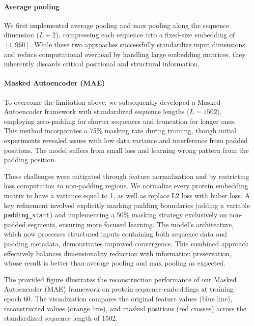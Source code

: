 \documentclass{article}
\begin{document}
	\paragraph{Average pooling} We first implemented {average pooling} and {max pooling} along the sequence dimension ($L+2$), compressing each sequence into a fixed-size embedding of $[1, 960]$. While these two approaches successfully standardize input dimensions and reduce computational overhead by handling large embedding matrices, they inherently discards critical positional and structural information.
	
	\paragraph{Masked Autoencoder (MAE)} To overcome the limitation above, we subsequently developed a {Masked Autoencoder} framework with standardized sequence lengths ($L = 1502$), employing zero-padding for shorter sequences and truncation for longer ones. 
	This method incorporates a 75\% masking rate during training, though initial experiments revealed issues with low data variance and interference from padded positions. The model suffers from small loss and learning wrong pattern from the padding position.
	
	 These challenges were mitigated through feature normalization and by restricting loss computation to non-padding regions. We normalize every protein embedding matrix to have a variance equal to 1, as well as replace L2 loss with huber loss. A key refinement involved explicitly marking padding boundaries (adding a variable \texttt{padding\_start}) and implementing a 50\% masking strategy exclusively on non-padded segments, ensuring more focused learning. The model's architecture, which now processes structured inputs containing both sequence data and padding metadata, demonstrates improved convergence. This combined approach effectively balances dimensionality reduction with information preservation, whose result is better than average pooling and max pooling as expected.
	
The provided figure illustrates the reconstruction performance of our Masked Autoencoder (MAE) framework on protein sequence embeddings at training epoch 60. The visualization compares the original feature values (blue line), reconstructed values (orange line), and masked positions (red crosses) across the standardized sequence length of 1502.
\end{document}

